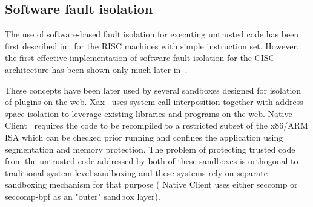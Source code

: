 
\subsection{Software fault isolation}
\label{related:sfi}

The use of software-based fault isolation for executing untrusted code has been
first described in~\cite{sfi:sosp93} for the RISC machines with simple
instruction set. However, the first effective implementation of software fault
isolation for the CISC architecture has been shown only much later
in~\cite{cisc-sfi:usenix-sec06}.

These concepts have been later used by several sandboxes designed for isolation
of plugins on the web. Xax~\cite{douceur08} uses system call interposition
together with address space isolation to leverage existing libraries and
programs on the web. Native Client~\cite{nacl} requires the code to be
recompiled to a restricted subset of the x86/ARM ISA which can be checked prior
running and confines the application using segmentation and memory protection.
The problem of protecting trusted code from the untrusted code addressed by
both of these sandboxes is orthogonal to traditional system-level sandboxing
and these systems rely on separate sandboxing mechanism for that purpose (\eg
Native Client uses either \textsf{seccomp} or \textsf{seccomp-bpf} as an
"outer" sandbox layer).


